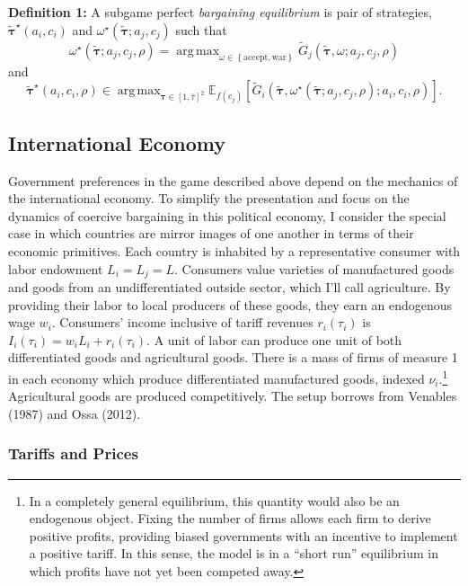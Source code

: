 \documentclass{puthesis}
\DeclareMathOperator*{\argmax}{arg\,max}
\begin{document}
\textbf{Definition 1:} A subgame perfect \emph{bargaining equilibrium}
is pair of strategies, \(\tilde{\bm{\tau}}^\star(a_i, c_i)\) and
\(\omega^\star(\tilde{\bm{\tau}}; a_j, c_j)\) such that \[
\omega^\star(\tilde{\bm{\tau}}; a_j, c_j, \rho) = \argmax_{\omega \in \left\{\text{accept}, \text{war} \right\}} \tilde{G}_j \left(\tilde{\bm{\tau}}, \omega; a_j, c_j, \rho \right)
\] and \[
\tilde{\bm{\tau}}^\star(a_i, c_i, \rho) \in \argmax_{\bm{\tau} \in [1, \bar{\tau}]^2} \mathbb{E}_{f(c_j)} \left[ \tilde{G}_i \left(\tilde{\bm{\tau}}, \omega^\star(\tilde{\bm{\tau}}; a_j, c_j, \rho); a_i, c_i, \rho \right) \right] .
\]

\subsection{International Economy}

Government preferences in the game described above depend on the
mechanics of the international economy. To simplify the presentation and
focus on the dynamics of coercive bargaining in this political economy,
I consider the special case in which countries are mirror images of one
another in terms of their economic primitives. Each country is inhabited
by a representative consumer with labor endowment \(L_i = L_j = L\).
Consumers value varieties of manufactured goods and goods from an
undifferentiated outside sector, which I'll call agriculture. By
providing their labor to local producers of these goods, they earn an
endogenous wage \(w_i\). Consumers' income inclusive of tariff revenues
\(r_i(\tau_i)\) is \(I_i(\tau_i) = w_i L_i + r_i(\tau_i)\). A unit of
labor can produce one unit of both differentiated goods and agricultural
goods. There is a mass of firms of measure 1 in each economy which
produce differentiated manufactured goods, indexed \(\nu_i\).\footnote{In
  a completely general equilibrium, this quantity would also be an
  endogenous object. Fixing the number of firms allows each firm to
  derive positive profits, providing biased governments with an
  incentive to implement a positive tariff. In this sense, the model is
  in a ``short run'' equilibrium in which profits have not yet been
  competed away.} Agricultural goods are produced competitively. The
setup borrows from Venables (1987) and Ossa (2012).

\subsubsection{Tariffs and Prices}
\end{document}
